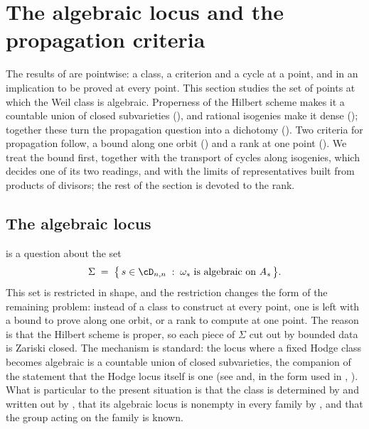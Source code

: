 \section{The algebraic locus and the propagation criteria}\label{sec:propagation}

The results of  are pointwise: a class, a criterion and
a cycle at a point, and in  an implication to be proved
at every point. This section studies the set of points at which the Weil class
is algebraic. Properness of the Hilbert scheme makes it a countable union of
closed subvarieties (), and rational isogenies make it
dense (); together these turn the propagation question
into a dichotomy (). Two criteria for propagation
follow, a bound along one orbit () and a rank at one
point (\cite[Theorem~2.3]{paperII}). We treat the bound first, together with
the transport of cycles along isogenies, which decides one of its two
readings, and with the limits of representatives built from products of
divisors; the rest of the section is devoted to the rank.

\subsection{The algebraic locus}
\label{ssec:properness}

 is a question about the set
\[
  \Sigma \;=\; \bigl\{\,s\in\cD_{n,n} \;:\;
    \omega_{s}\ \text{is algebraic on}\ A_{s}\,\bigr\}.
\]
This set is restricted in shape, and the restriction changes the form
of the remaining problem: instead of a class to construct at every point, one
is left with a bound to prove along one orbit, or a rank to compute at one
point. The reason is that the Hilbert scheme is proper, so each piece of
$\Sigma$ cut out by bounded data is Zariski closed. The mechanism is standard:
the locus where a fixed Hodge class becomes algebraic is a countable union of
closed subvarieties, the companion of the statement that the Hodge locus
itself is one (see \cite[Chapter~5]{Voi03} and, in the form used in
, \cite{CDK95}). What is particular to the present situation is
that the class is determined by  and written out by
, that its algebraic locus is nonempty in every family
by , and that the group acting on the family is known.

